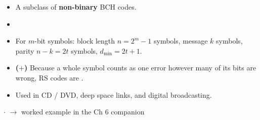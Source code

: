 {\begin{itemize}
\begin{itemize}
    \item A subclass of \textbf{non-binary} BCH codes.
    \item {}
    \item For $m$-bit symbols: block length $n = 2^m - 1$ symbols, message $k$ symbols, parity
          $n-k = 2t$ symbols, $d_{\min} = 2t+1$.
    \item \textbf{($+$)} Because a whole symbol counts as one error however many of its bits are
          wrong, RS codes are .
    \item Used in CD / DVD, deep space links, and digital broadcasting.
  \end{itemize}
\end{itemize}}

{\color{sub}\footnotesize {}  \gap$\cdot$\gap
{} $\rightarrow$ worked example in the Ch 6 companion}

